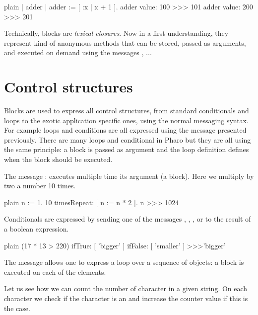 \documentclass[10pt,twoside,english]{_support/latex/sbabook/sbabook}
\begin{document}
\begin{displaycode}{plain}
| adder |
adder := [ :x | x + 1 ].
adder value: 100
>>> 101
adder value: 200
>>> 201
\end{displaycode}

\begin{important}
Technically, blocks are \textit{lexical closures}. Now in a first understanding, they represent kind of anonymous methods that can be stored, passed as arguments, and executed on demand using the messages , ...
\end{important}
\section{Control structures}
Blocks are used to express all control structures, from standard conditionals and loops to the exotic application specific ones, using the normal messaging syntax. For example loops and conditions are all expressed using the message presented previously. There are many loops and conditional in Pharo but they are all using the same principle: a block is passed as argument and the loop definition defines when the block should be executed. 

The message : executes multiple time its argument (a block).
Here we multiply by two a number 10 times. 

\begin{displaycode}{plain}
n := 1.
10 timesRepeat: [ n := n * 2 ].
n 
>>> 1024
\end{displaycode}

Conditionals are expressed by sending one of the messages ,
, , or  to the result of a boolean expression.

\begin{displaycode}{plain}
(17 * 13 > 220)
	ifTrue: [ 'bigger' ]
	ifFalse: [ 'smaller' ] 
>>>'bigger'
\end{displaycode}

The message  allows one to express a loop over a sequence of objects: a block is executed on each of the elements. 

Let us see how we can count the number of character  in a given string. On each character we check 
if the character is an  and increase the counter value if this is the case. 

\end{document}

